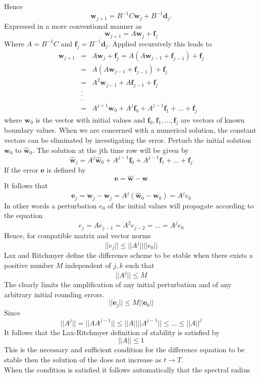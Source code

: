 Hence
\[ \mathbf{w}_{j+1}=B^{-1}C\mathbf{w}_j+B^{-1}\mathbf{d}_j. \]
Expressed in a more conventional manner as
\[ \mathbf{w}_{j+1}=A\mathbf{w}_j+\mathbf{f}_j \]
Where $A=B^{-1}C$ and $\mathbf{f}_j =B^{-1}\mathbf{d}_j$.  Applied recursively this leads to
\begin{eqnarray*}
 \mathbf{w}_{j+1}&=&A\mathbf{w}_j+\mathbf{f}_j =A(A\mathbf{w}_{j-1}+\mathbf{f}_{j-1}) +\mathbf{f}_j \\
&=&A(A\mathbf{w}_{j-1}+\mathbf{f}_{j-1}) +\mathbf{f}_j \\
&=&A^2\mathbf{w}_{j-1}+A\mathbf{f}_{j-1} +\mathbf{f}_j \\
&.&\\
&.&\\
&.&\\
&=&A^{j+1}\mathbf{w}_0+A^j\mathbf{f}_0+A^{j-1}\mathbf{f}_1+...+\mathbf{f}_{j}
\end{eqnarray*}
where $\mathbf{w}_0$ is the vector with initial values and $\mathbf{f}_0,\mathbf{f}_1,...,\mathbf{f}_{j}$ are vectors of known boundary values.  When we are concerned with a numerical solution, the constant vectors can be eliminated by investigating the error.  Perturb the initial solution $\mathbf{w}_0$ to $\mathbf{\hat{w}}_0$.  The solution at the jth time row will be given by
\[\mathbf{\hat{w}}_j=A^{j}\mathbf{\hat{w}}_0+A^{j-1}\mathbf{f}_0+A^{j-1}\mathbf{f}_1+...+\mathbf{f}_{j}
\]
If the error $\mathbf{e}$ is defined by 
\[ \mathbf{e}=\mathbf{\hat{w}}-\mathbf{w}\]
It follows that 
\[ \mathbf{e}_j=\mathbf{\hat{w}}_j-\mathbf{w}_j=A^{j}(\mathbf{\hat{w}}_0-\mathbf{w}_0)=A^{j}e_0\]
In other words a perturbation $e_0$ of the initial values will propagate according to the equation 
\[e_j=Ae_{j-1}=A^2e_{j-2}=...=A^je_0 \]
Hence, for compatible matrix and vector norms
\[||e_{j}||\leq ||A^{j}||||e_0||\]
Lax and Ritchmyer define the difference scheme to be stable when there exists a positive number $M$ independent of $j,k$ such that 
\[ ||A^{j}||\leq M \]
The clearly limits the amplification of any initial perturbation and of any arbitrary initial rounding errors.
\[ ||\mathbf{e}_j||\leq M||\mathbf{e}_0|| \]
Since
\[ ||A^j||= ||AA^{j-1}||\leq ||A||||A^{j-1}|| \leq ... \leq ||A||^j \]
It follows that the Lax-Ritchmyer definition of stability is satisfied by
\[||A|| \leq 1\]
This is the necessary and sufficient condition for the difference equation to be
stable then the solution of the  does not increase as $t \rightarrow T$.\\
When the condition is satisfied it follows automatically that the spectral radius
